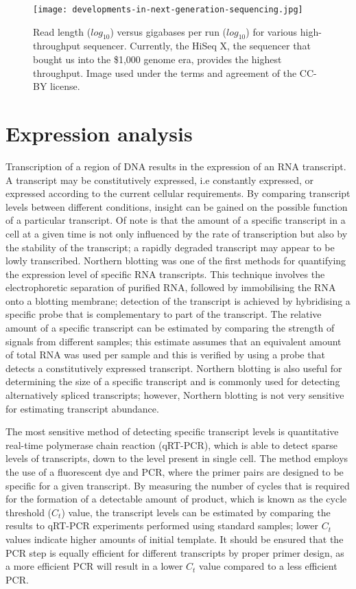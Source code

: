 \begin{figure}[!ht]
   \centering
   \texttt{[image: developments-in-next-generation-sequencing.jpg]}
   \caption[Developments in next generation sequencing]{Read length ($ log_{10} $) versus gigabases per run ($ log_{10} $) for various high-throughput sequencer\cite{Nederbragt2012}. Currently, the HiSeq X, the sequencer that bought us into the \$1,000 genome era, provides the highest throughput. Image used under the terms and agreement of the CC-BY license.}
   \label{fig:dev_next_gen}
\end{figure}

\section{Expression analysis}

Transcription of a region of DNA results in the expression of an RNA transcript. A transcript may be constitutively expressed, i.e constantly expressed, or expressed according to the current cellular requirements. By comparing transcript levels between different conditions, insight can be gained on the possible function of a particular transcript. Of note is that the amount of a specific transcript in a cell at a given time is not only influenced by the rate of transcription but also by the stability of the transcript; a rapidly degraded transcript may appear to be lowly transcribed. Northern blotting\cite{pmid414220} was one of the first methods for quantifying the expression level of specific RNA transcripts. This technique involves the electrophoretic separation of purified RNA, followed by immobilising the RNA onto a blotting membrane; detection of the transcript is achieved by hybridising a specific probe that is complementary to part of the transcript. The relative amount of a specific transcript can be estimated by comparing the strength of signals from different samples; this estimate assumes that an equivalent amount of total RNA was used per sample and this is verified by using a probe that detects a constitutively expressed transcript. Northern blotting is also useful for determining the size of a specific transcript and is commonly used for detecting alternatively spliced transcripts; however, Northern blotting is not very sensitive for estimating transcript abundance.

The most sensitive method of detecting specific transcript levels is quantitative real-time polymerase chain reaction (qRT-PCR), which is able to detect sparse levels of transcripts, down to the level present in single cell. The method employs the use of a fluorescent dye and PCR, where the primer pairs are designed to be specific for a given transcript. By measuring the number of cycles that is required for the formation of a detectable amount of product, which is known as the cycle threshold ($C_{t}$) value, the transcript levels can be estimated by comparing the results to qRT-PCR experiments performed using standard samples; lower $C_{t}$ values indicate higher amounts of initial template. It should be ensured that the PCR step is equally efficient for different transcripts by proper primer design, as a more efficient PCR will result in a lower $C_{t}$ value compared to a less efficient PCR.

